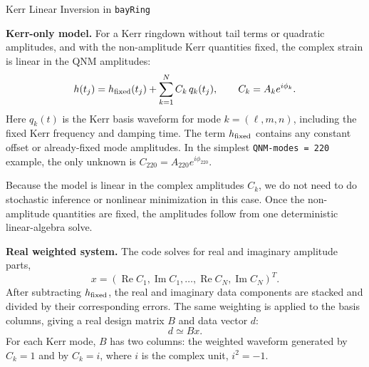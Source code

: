 \documentclass[10pt]{article}
\begin{document}
\begin{center}
{\Large Kerr Linear Inversion in \texttt{bayRing}}
\end{center}

\textbf{Kerr-only model.}
For a Kerr ringdown without tail terms or quadratic amplitudes, and with the
non-amplitude Kerr quantities fixed, the complex strain is linear in the QNM
amplitudes:
\begin{equation}
  h(t_j) = h_{\rm fixed}(t_j)
  + \sum_{k=1}^{N} C_k\,q_k(t_j),
  \qquad
  C_k = A_k e^{i\phi_k}.
\end{equation}
Here \(q_k(t)\) is the Kerr basis waveform for mode \(k=(\ell,m,n)\), including
the fixed Kerr frequency and damping time. The term \(h_{\rm fixed}\) contains
any constant offset or already-fixed mode amplitudes. In the simplest
\texttt{QNM-modes = 220} example, the only unknown is
\(C_{220}=A_{220}e^{i\phi_{220}}\).

Because the model is linear in the complex amplitudes \(C_k\), we do not need to
do stochastic inference or nonlinear minimization in this case. Once the
non-amplitude quantities are fixed, the amplitudes follow from one deterministic
linear-algebra solve.

\textbf{Real weighted system.}
The code solves for real and imaginary amplitude parts,
\begin{equation}
  x =
  \left(\operatorname{Re}C_1,\operatorname{Im}C_1,\ldots,
        \operatorname{Re}C_N,\operatorname{Im}C_N\right)^T .
\end{equation}
After subtracting \(h_{\rm fixed}\), the real and imaginary data components are
stacked and divided by their corresponding errors. The same weighting is applied
to the basis columns, giving a real design matrix \(B\) and data vector \(d\):
\begin{equation}
  d \simeq Bx .
\end{equation}
For each Kerr mode, \(B\) has two columns: the weighted waveform generated by
\(C_k=1\) and by \(C_k=i\), where \(i\) is the complex unit, \(i^2=-1\).
\end{document}
